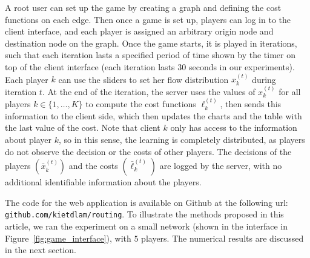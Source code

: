 \documentclass{sig-alternate-ipsn13}
\begin{document}
A root user can set up the game by creating a graph and defining the cost functions on each edge. Then once a game is set up, players can log in to the client interface, and each player is assigned an arbitrary origin node and destination node on the graph. Once the game starts, it is played in iterations, such that each iteration lasts a specified period of time shown by the timer on top of the client interface (each iteration lasts $30$ seconds in our experiments). Each player $k$ can use the sliders to set her flow distribution $x^{(t)}_k$ during iteration $t$. At the end of the iteration, the server uses the values of $x_k^{(t)}$ for all players $k \in \{1, \dots, K\}$ to compute the cost functions $\ell^{(t)}_k$, then sends this information to the client side, which then updates the charts and the table with the last value of the cost. Note that client $k$ only has access to the information about player $k$, so in this sense, the learning is completely distributed, as players do not observe the decision or the costs of other players. The decisions of the players $(\bar x_k^{(t)})$ and the costs $(\bar \ell^{(t)}_k)$ are logged by the server, with no additional identifiable information about the players.

The code for the web application is available on Github at the following url: \texttt{github.com/kietdlam/routing}. To illustrate the methods proposed in this article, we ran the experiment on a small network (shown in the interface in Figure~\ref{fig:game_interface}), with $5$ players. The numerical results are discussed in the next section.





\end{document}
